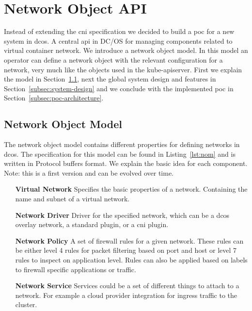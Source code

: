 \section{Network Object API}
\label{sec:networkobject-api}
Instead of extending the \gls{cni} specification we decided to build a \gls{poc} for a new system in \gls{dcos}. A central \gls{api} in DC/OS for managing components related to virtual container network. We introduce a network object model. In this model an operator can define a network object with the relevant configuration for a network, very much like the objects used in the kube-apiserver. First we explain the model in Section~\ref{subsec:network-object-model}, next the global system design and features in Section~\ref{subsec:system-design} and we conclude with the implemented \gls{poc} in Section~\ref{subsec:poc-architecture}.

\subsection{Network Object Model}
\label{subsec:network-object-model}
The network object model contains different properties for defining networks in \gls{dcos}. The specification for this model can be found in Listing~\ref{lst:nom} and is written in Protocol buffers format. We explain the basic idea for each component. Note: this is a first version and can be evolved over time.



\begin{itemize}
    \item[\textbf{Virtual Network}] Specifies the basic properties of a network. Containing the name and subnet of a virtual network.
    \item[\textbf{Network Driver}] Driver for the specified network, which can be  a \gls{dcos} overlay network, a standard plugin, or a \gls{cni} plugin.
    \item[\textbf{Network Policy}] A set of firewall rules for a given network. These rules can be either level 4 rules for packet filtering based on port and host or level 7 rules to inspect on application level. Rules can also be applied based on labels to firewall specific applications or traffic.
    \item[\textbf{Network Service}] Services could be a set of different things to attach to a network. For example a cloud provider integration for ingress traffic to the cluster.
\end{itemize}

